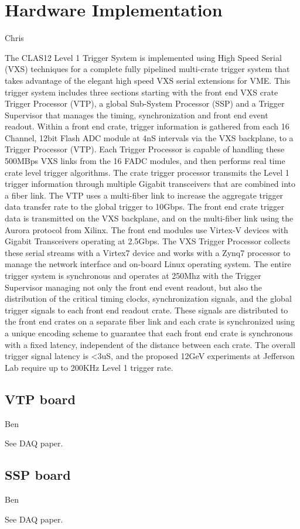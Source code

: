 \section{Hardware Implementation} Chris

The CLAS12 Level 1 Trigger System is implemented using High Speed Serial (VXS) techniques for a complete fully pipelined multi-crate trigger system that takes advantage of the elegant high speed VXS serial extensions for VME.  This trigger system includes three sections starting with the front end VXS crate Trigger Processor (VTP), a global Sub-System Processor (SSP) and a Trigger Supervisor that manages the timing, synchronization and front end event readout.  
Within a front end crate, trigger information is gathered from each 16 Channel, 12bit Flash ADC module at 4nS intervals via the VXS backplane, to a Trigger Processor (VTP).  Each Trigger Processor is capable of handling these 500MBps VXS links from the 16 FADC modules, and then performs real time crate level trigger algorithms.  The crate trigger processor transmits the Level 1 trigger information through multiple Gigabit transceivers that are combined into a fiber link.  The VTP uses a multi-fiber link to increase the aggregate trigger data transfer rate to the global trigger to 10Gbps.
The front end crate trigger data is transmitted on the VXS backplane, and on the multi-fiber link using the Aurora protocol from Xilinx.  The front end modules use Virtex-V devices with Gigabit Transceivers operating at 2.5Gbps. The VXS Trigger Processor collects these serial streams with a Virtex7 device and works with a Zynq7 processor to manage the network interface and on-board Linux operating system.
The entire trigger system is synchronous and operates at 250Mhz with the Trigger Supervisor managing not only the front end event readout, but also the distribution of the critical timing clocks, synchronization signals, and the global trigger signals to each front end readout crate.  These signals are distributed to the front end crates on a separate fiber link and each crate is synchronized using a unique encoding scheme to guarantee that each front end crate is synchronous with a fixed latency, independent of the distance between each crate.  The overall trigger signal latency is <3uS, and the proposed 12GeV experiments at Jefferson Lab require up to 200KHz Level 1 trigger rate.

\subsection{VTP board} Ben

See DAQ paper.

\subsection{SSP board} Ben

See DAQ paper.
